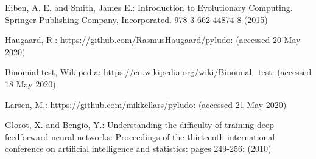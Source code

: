 \documentclass{llncs}
\begin{document}
\begin{thebibliography}{}

Eiben, A. E. and Smith, James E.:
Introduction to Evolutionary Computing.
Springer Publishing Company, Incorporated.
978-3-662-44874-8 (2015)

Haugaard, R.:
\url{https://github.com/RasmusHaugaard/pyludo}:
(accessed 20 May 2020)

Binomial test, Wikipedia:
\url{https://en.wikipedia.org/wiki/Binomial_test}:
(accessed 18 May 2020)

Larsen, M.:
\url{https://github.com/mikkellars/pyludo}:
(accessed 21 May 2020)

Glorot, X. and Bengio, Y.:
Understanding the difficulty of training deep feedforward neural networks:
Proceedings of the thirteenth international conference on artificial intelligence and statistics:
pages 249-256:
(2010)

\end{thebibliography}
\end{document}
